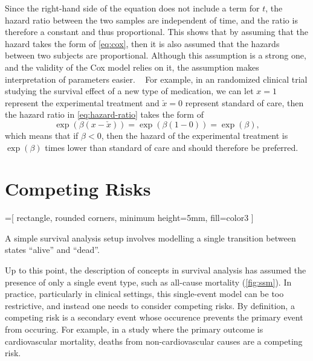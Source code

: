Since the right-hand side of the equation does not include a term for \(t\),
the hazard ratio between the two samples are independent of time, 
and the ratio is therefore a constant and thus proportional.
This shows that by assuming that the hazard takes the form of \cref{eq:cox},
then it is also assumed that the hazards between two subjects are proportional.
Although this assumption is a strong one, 
and the validity of the Cox model relies on it, 
the assumption makes interpretation of parameters easier.
~\autocite{tutzModeling2016}
For example, 
in an randomized clinical trial
studying the survival effect of a new type of medication, 
we can let \(x = 1\) represent the experimental treatment  
and \(\check{x} = 0\) represent standard of care, 
then the hazard ratio in \cref{eq:hazard-ratio} takes the form of
%
\begin{equation}
      \exp \left(\beta (x - \check{x})\right)
    = \exp \left(\beta (1 - 0)\right)
    = \exp (\beta ),
\end{equation}
%
which means that if \(\beta < 0\), 
then the hazard of the experimental treatment is 
\(\exp({\beta})\) times lower than standard of care
and should therefore be preferred.%


\section{Competing Risks}

\begin{marginfigure}[3em]%
    =[%
        rectangle, rounded corners, minimum height=5mm, fill=color3
    ]
    \centering
    \caption[A Single State Model]{
        A simple survival analysis setup 
        involves modelling a single transition between states 
        \enquote{alive} and \enquote{dead}.
    }
    \label{fig:ssm}
\end{marginfigure}%

Up to this point, the description of concepts in survival analysis has
assumed the presence of only a single event type, such as all-cause mortality
(\cref{fig:ssm}).
In practice, particularly in clinical settings, 
this single-event model can be too restrictive,
and instead one needs to consider competing risks.
By definition, a competing risk is a secondary event whose occurence 
prevents the primary event from occuring.
For example,
in a study where the primary outcome is cardiovascular mortality,
deaths from non-cardiovascular causes are a competing risk.

